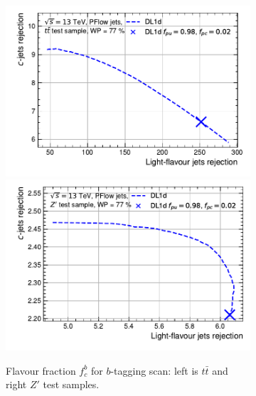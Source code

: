 \begin{figure}[h!]
  \centering
  \begin{subfigure}[b]{0.98\textwidth}
      \centering
      \includegraphics[scale=0.65]{Images/FTAG/DL1d/extra_plots/contour_fraction_ttbar_300.pdf}
      \includegraphics[scale=0.65]{Images/FTAG/DL1d/extra_plots/contour_fraction_zp_300.pdf}
      \caption{Flavour fraction $f_c^b$ for $b$-tagging scan: left is $t\bar{t}$ and right $Z'$ test samples.} 
      \label{fig:DL1dscanfb}
  \end{subfigure}\\
  \begin{subfigure}[b]{0.98\textwidth}
    \centering %

\end{subfigure}
\end{figure}
